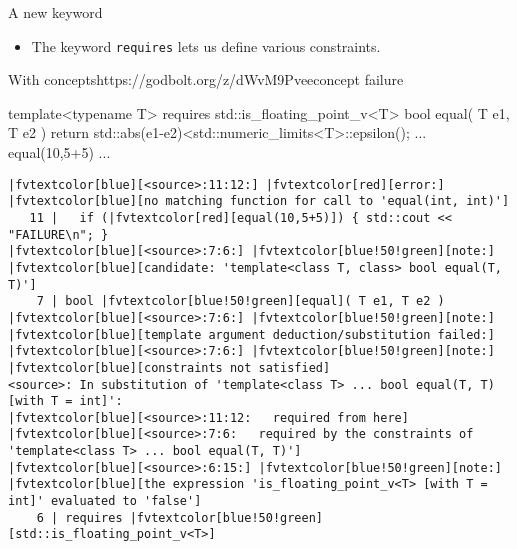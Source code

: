 \begin{frame}[fragile]
  \begin{block}{A new keyword}
    \begin{itemize}
      \item The keyword \texttt{requires} lets us define various constraints.
    \end{itemize}
  \end{block}
  \begin{exampleblockGB}{With concepts}{https://godbolt.org/z/dWvM9Pvee}{concept failure}
    \scriptsize
    \begin{cppcode*}{}
    template<typename T>
    requires std::is_floating_point_v<T>
    bool equal( T e1, T e2 ) {
      return std::abs(e1-e2)<std::numeric_limits<T>::epsilon();
    }
    ... equal(10,5+5) ...
    \end{cppcode*}
    \pause
    \tiny
    \begin{Verbatim}[commandchars=\|\[\]]
|fvtextcolor[blue][<source>:11:12:] |fvtextcolor[red][error:] |fvtextcolor[blue][no matching function for call to 'equal(int, int)']
   11 |   if (|fvtextcolor[red][equal(10,5+5)]) { std::cout << "FAILURE\n"; }
|fvtextcolor[blue][<source>:7:6:] |fvtextcolor[blue!50!green][note:] |fvtextcolor[blue][candidate: 'template<class T, class> bool equal(T, T)']
    7 | bool |fvtextcolor[blue!50!green][equal]( T e1, T e2 )
|fvtextcolor[blue][<source>:7:6:] |fvtextcolor[blue!50!green][note:]   |fvtextcolor[blue][template argument deduction/substitution failed:]
|fvtextcolor[blue][<source>:7:6:] |fvtextcolor[blue!50!green][note:] |fvtextcolor[blue][constraints not satisfied]
<source>: In substitution of 'template<class T> ... bool equal(T, T) [with T = int]':
|fvtextcolor[blue][<source>:11:12:   required from here]
|fvtextcolor[blue][<source>:7:6:   required by the constraints of 'template<class T> ... bool equal(T, T)']
|fvtextcolor[blue][<source>:6:15:] |fvtextcolor[blue!50!green][note:] |fvtextcolor[blue][the expression 'is_floating_point_v<T> [with T = int]' evaluated to 'false']
    6 | requires |fvtextcolor[blue!50!green][std::is_floating_point_v<T>]
    \end{Verbatim}
  \end{exampleblockGB}
\end{frame}

